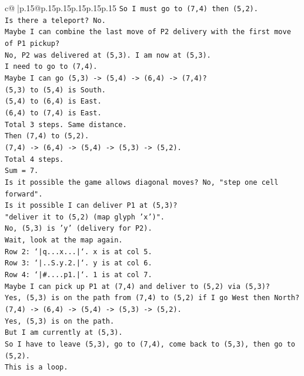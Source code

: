\documentclass{article}
\begin{document}
{\begin{supertabular}{c@{$\;$}|p{.15\linewidth}@{}p{.15\linewidth}p{.15\linewidth}p{.15\linewidth}p{.15\linewidth}p{.15\linewidth}}
{{{\texttt{So I must go to (7,4) then (5,2).} \\
\texttt{Is there a teleport? No.} \\
\texttt{Maybe I can combine the last move of P2 delivery with the first move of P1 pickup?} \\
\texttt{No, P2 was delivered at (5,3). I am now at (5,3).} \\
\texttt{I need to go to (7,4).} \\
\texttt{Maybe I can go (5,3) {-}> (5,4) {-}> (6,4) {-}> (7,4)?} \\
\texttt{(5,3) to (5,4) is South.} \\
\texttt{(5,4) to (6,4) is East.} \\
\texttt{(6,4) to (7,4) is East.} \\
\texttt{Total 3 steps. Same distance.} \\
\texttt{Then (7,4) to (5,2).} \\
\texttt{(7,4) {-}> (6,4) {-}> (5,4) {-}> (5,3) {-}> (5,2).} \\
\texttt{Total 4 steps.} \\
\texttt{Sum = 7.} \\
\texttt{Is it possible the game allows diagonal moves? No, "step one cell forward".} \\
\texttt{Is it possible I can deliver P1 at (5,3)?} \\
\texttt{"deliver it to (5,2) (map glyph 'x')".} \\
\texttt{No, (5,3) is 'y' (delivery for P2).} \\
\texttt{Wait, look at the map again.} \\
\texttt{Row 2: `|q...x...|`. x is at col 5.} \\
\texttt{Row 3: `|..S.y.2.|`. y is at col 6.} \\
\texttt{Row 4: `|\#....p1.|`. 1 is at col 7.} \\
\texttt{Maybe I can pick up P1 at (7,4) and deliver to (5,2) via (5,3)?} \\
\texttt{Yes, (5,3) is on the path from (7,4) to (5,2) if I go West then North?} \\
\texttt{(7,4) {-}> (6,4) {-}> (5,4) {-}> (5,3) {-}> (5,2).} \\
\texttt{Yes, (5,3) is on the path.} \\
\texttt{But I am currently at (5,3).} \\
\texttt{So I have to leave (5,3), go to (7,4), come back to (5,3), then go to (5,2).} \\
\texttt{This is a loop.} \\
}}}
\end{supertabular}}
\end{document}
